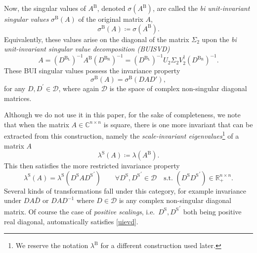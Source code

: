\documentclass[11pt,a4paper]{article}
\newcommand{\be}{\begin{equation}}
\newcommand{\ee}{\end{equation}}
\begin{document}
Now, the singular values of \( A^\mathrm{B} \), denoted \( \sigma(A^\mathrm{B}) \), are called the \textit{bi unit-invariant singular values} \( \sigma^\mathrm{B}(A) \) of the original matrix $A$,
\begin{equation}
\sigma^\mathrm{B}(A) \coloneq \sigma(A^\mathrm{B}). \label{sigmaU}
\end{equation}
Equivalently, these values arise on the diagonal of the matrix $\Sigma_2$ upon the \textit{bi unit-invariant singular value decomposition (BUISVD)}
\begin{equation}
A = (D^\mathrm{B_L})^{-1}A^\mathrm{B}(D^\mathrm{B_R})^{-1} = (D^\mathrm{B_L})^{-1} U_2 \Sigma_2 V^\dagger_2 (D^\mathrm{B_R})^{-1}.
\end{equation}
These BUI singular values possess the invariance property
\begin{equation}
\sigma^\mathrm{B}(A) = \sigma^\mathrm{B}(DAD'),
\end{equation}
for any \( D,D^\prime \in \mathcal{D} \), where again $\mathcal{D}$ is the space of complex non-singular diagonal matrices.

Although we do not use it in this paper, for the sake of completeness, we note that when the matrix $A\in \mathbb C^{n\times n}$ is square, there is one more invariant that can be extracted from this construction, namely the \textit{scale-invariant eigenvalues}\footnote{We reserve the notation $\lambda^\mathrm B$ for a different construction used later.} of a matrix $A$
\be
\lambda^\mathrm S (A) \coloneq \lambda(A^\mathrm B).
\ee
This then satisfies the more restricted invariance property 
\be\label{uievd}
\lambda^\mathrm S (A) = \lambda^\mathrm S (D^\mathrm S A {D^\mathrm S}^\prime) \qquad \forall D^\mathrm S,{D^\mathrm S}^\prime \in \mathcal{D} \quad \text{s.t. } (D^\mathrm S {D^\mathrm S}^\prime)\in \mathbb R^{n\times n}_{+}.
\ee
Several kinds of transformations fall under this category, for example invariance under $DA\bar D$ or $DAD^{-1}$ where $D \in \mathcal D$ is any complex non-singular diagonal matrix. Of course the case of \textit{positive scalings}, i.e.\ $D^\mathrm S,{D^\mathrm S}^\prime$ both being positive real diagonal, automatically satisfies \cref{uievd}.
\end{document}
